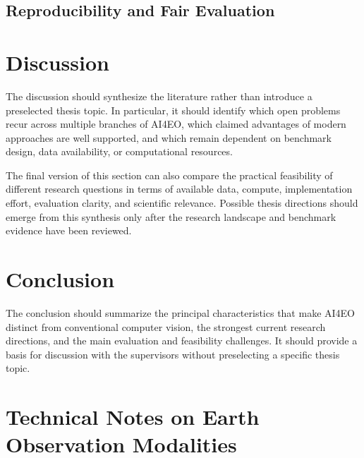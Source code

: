 \documentclass[
    11pt,
    a4paper,
    parskip=half,
    bibliography=totoc,
    numbers=noenddot
]{scrartcl}
\begin{document}
\subsection{Reproducibility and Fair Evaluation}


\section{Discussion}

The discussion should synthesize the literature rather than introduce a
preselected thesis topic. In particular, it should identify which open
problems recur across multiple branches of AI4EO, which claimed
advantages of modern approaches are well supported, and which remain
dependent on benchmark design, data availability, or computational
resources.

The final version of this section can also compare the practical
feasibility of different research questions in terms of available data,
compute, implementation effort, evaluation clarity, and scientific
relevance. Possible thesis directions should emerge from this synthesis
only after the research landscape and benchmark evidence have been
reviewed.

\section{Conclusion}

The conclusion should summarize the principal characteristics that make
AI4EO distinct from conventional computer vision, the strongest current
research directions, and the main evaluation and feasibility challenges.
It should provide a basis for discussion with the supervisors without
preselecting a specific thesis topic.


\appendix

\section{Technical Notes on Earth Observation Modalities}
\label{app:eo-technical}
\end{document}
